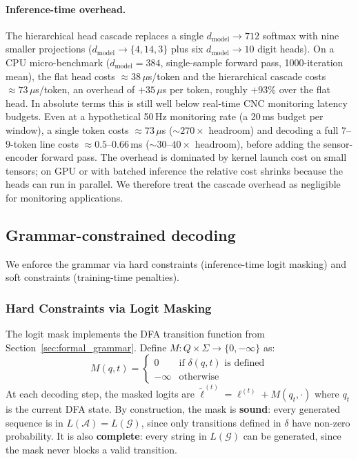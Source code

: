 \documentclass[sensors,article,submit,moreauthors,pdftex]{Definitions/mdpi}
\begin{document}
\paragraph{Inference-time overhead.}
The hierarchical head cascade replaces a single $d_{\text{model}} \to 712$ softmax with nine smaller projections ($d_{\text{model}} \to \{4, 14, 3\}$ plus six $d_{\text{model}} \to 10$ digit heads). On a CPU micro-benchmark ($d_{\text{model}} = 384$, single-sample forward pass, 1000-iteration mean), the flat head costs $\approx\!38\,\mu$s/token and the hierarchical cascade costs $\approx\!73\,\mu$s/token, an overhead of $+35\,\mu$s per token, roughly $+93\%$ over the flat head. In absolute terms this is still well below real-time CNC monitoring latency budgets. Even at a hypothetical 50\,Hz monitoring rate (a 20\,ms budget per window), a single token costs $\approx\!73\,\mu$s ($\sim\!270\times$ headroom) and decoding a full $7$--$9$-token line costs $\approx\!0.5$--$0.66\,$ms ($\sim\!30$--$40\times$ headroom), before adding the sensor-encoder forward pass. The overhead is dominated by kernel launch cost on small tensors; on GPU or with batched inference the relative cost shrinks because the heads can run in parallel. We therefore treat the cascade overhead as negligible for monitoring applications.

\subsection{Grammar-constrained decoding}
\label{sec:constrained_decoding}

We enforce the grammar via hard constraints (inference-time logit masking) and soft constraints (training-time penalties).

\subsubsection{Hard Constraints via Logit Masking}

The logit mask implements the DFA transition function from Section~\ref{sec:formal_grammar}. Define $M: Q \times \Sigma \to \{0, -\infty\}$ as:
\begin{equation}
    M(q, t) = \begin{cases} 0 & \text{if } \delta(q, t) \text{ is defined} \\ -\infty & \text{otherwise} \end{cases}
\end{equation}
At each decoding step, the masked logits are $\tilde{\ell}^{(t)} = \ell^{(t)} + M(q_t, \cdot)$ where $q_t$ is the current DFA state. By construction, the mask is \textbf{sound}: every generated sequence is in $L(\mathcal{A}) = L(\mathcal{G})$, since only transitions defined in $\delta$ have non-zero probability. It is also \textbf{complete}: every string in $L(\mathcal{G})$ can be generated, since the mask never blocks a valid transition.
\end{document}
